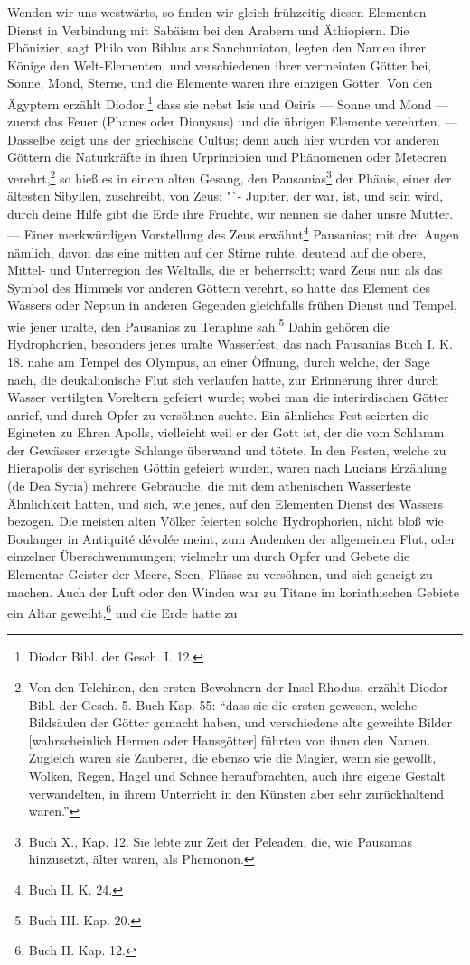 \documentclass[a4paper, 11pt, oneside, polutonikogreek, german]{article}
\begin{document}
Wenden wir uns westwärts, so finden wir gleich frühzeitig diesen Elementen-Dienst in Verbindung mit Sabäism bei den Arabern und Äthiopiern. Die Phönizier, sagt Philo von Biblus aus Sanchuniaton, legten den Namen ihrer Könige den Welt-Elementen, und verschiedenen ihrer vermeinten Götter bei, Sonne, Mond, Sterne, und die Elemente waren ihre einzigen Götter. Von den Ägyptern erzählt Diodor,\footnote{Diodor Bibl. der Gesch. I. 12.} dass sie nebst Isis und Osiris --- Sonne und Mond --- zuerst das Feuer (Phanes oder Dionysus) und die übrigen Elemente verehrten. --- Dasselbe zeigt uns der griechische Cultus; denn auch hier wurden vor anderen Göttern die Naturkräfte in ihren Urprincipien und Phänomenen oder Meteoren verehrt,\footnote{Von den Telchinen, den ersten Bewohnern der Insel Rhodus, erzählt Diodor Bibl. der Gesch. 5. Buch Kap. 55: "`dass sie die ersten gewesen, welche Bildsäulen der Götter gemacht haben, und verschiedene alte geweihte Bilder [wahrscheinlich Hermen oder Hausgötter] führten von ihnen den Namen. Zugleich waren sie Zauberer, die ebenso wie die Magier, wenn sie gewollt, Wolken, Regen, Hagel und Schnee heraufbrachten, auch ihre eigene Gestalt verwandelten, in ihrem Unterricht in den Künsten aber sehr zurückhaltend waren."'} so hieß es in einem alten Gesang, den Pausanias\footnote{Buch X., Kap. 12. Sie lebte zur Zeit der Peleaden, die, wie Pausanias hinzusetzt, älter waren, als Phemonon.} der Phänis, einer der ältesten Sibyllen, zuschreibt, von Zeus: "`- Jupiter, der war, ist, und sein wird, durch deine Hilfe gibt die Erde ihre Früchte, wir nennen sie daher unsre Mutter. --- Einer merkwürdigen Vorstellung des Zeus erwähnt\footnote{Buch II. K. 24.} Pausanias; mit drei Augen nämlich, davon das eine mitten auf der Stirne ruhte, deutend auf die obere, Mittel- und Unterregion des Weltalls, die er beherrscht; ward Zeus nun als das Symbol des Himmels vor anderen Göttern verehrt, so hatte das Element des Wassers oder Neptun in anderen Gegenden gleichfalls frühen Dienst und Tempel, wie jener uralte, den Pausanias zu Teraphne sah.\footnote{Buch III. Kap. 20.} Dahin gehören die Hydrophorien, besonders jenes uralte Wasserfest, das nach Pausanias Buch I. K. 18. nahe am Tempel des Olympus, an einer Öffnung, durch welche, der Sage nach, die deukalionische Flut sich verlaufen hatte, zur Erinnerung ihrer durch Wasser vertilgten Voreltern gefeiert wurde; wobei man die interirdischen Götter anrief, und durch Opfer zu versöhnen suchte. Ein ähnliches Fest seierten die Egineten zu Ehren Apolls, vielleicht weil er der Gott ist, der die vom Schlamm der Gewässer erzeugte Schlange überwand und tötete. In den Festen, welche zu Hierapolis der syrischen Göttin gefeiert wurden, waren nach Lucians Erzählung (de Dea Syria) mehrere Gebräuche, die mit dem athenischen Wasserfeste Ähnlichkeit hatten, und sich, wie jenes, auf den Elementen Dienst des Wassers bezogen. Die meisten alten Völker feierten solche Hydrophorien, nicht bloß wie Boulanger in Antiquité dévolée meint, zum Andenken der allgemeinen Flut, oder einzelner Überschwemmungen; vielmehr um durch Opfer und Gebete die Elementar-Geister der Meere, Seen, Flüsse zu versöhnen, und sich geneigt zu machen. Auch der Luft oder den Winden war zu Titane im korinthischen Gebiete ein Altar geweiht,\footnote{Buch II. Kap. 12.} und die Erde hatte zu 
\end{document}
